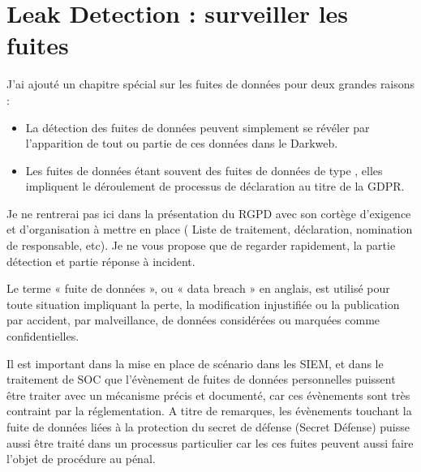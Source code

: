 

\section{Leak Detection : surveiller les fuites}

J'ai ajouté un chapitre spécial sur les fuites de données pour deux grandes raisons :

\begin{itemize}
  \item La détection des fuites de données peuvent simplement se révéler par l'apparition de tout ou partie de ces données dans le Darkweb. 
  \item Les fuites de données étant souvent des fuites de données de type , elles impliquent le déroulement de processus de déclaration au titre de la GDPR.
\end{itemize}


Je ne rentrerai pas ici dans la présentation du RGPD avec son cortège d'exigence et d'organisation à mettre en place (
Liste de traitement, déclaration, nomination de responsable, etc).
Je ne vous propose que de regarder rapidement, la partie détection et partie réponse à incident.

Le terme « fuite de données », ou « data breach » en anglais, est utilisé pour toute situation impliquant la perte, la modification injustifiée ou la publication par accident, par malveillance, de données considérées ou marquées comme confidentielles. 

Il est important dans la mise en place de scénario dans les SIEM, et dans le traitement de SOC que l'évènement de fuites de données personnelles puissent être traiter avec un mécanisme précis et documenté, car ces évènements sont très contraint par la réglementation.
A titre de remarques, les évènements touchant la fuite de données liées à la protection du secret de défense (Secret Défense) puisse aussi être traité dans un processus particulier car les ces fuites peuvent aussi faire l'objet de procédure au pénal.


